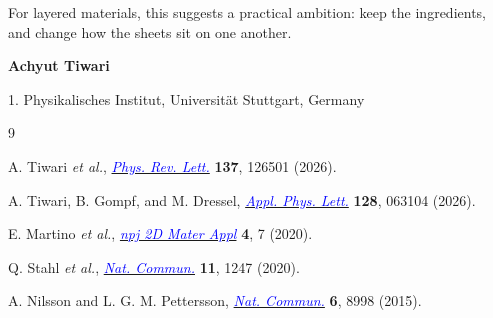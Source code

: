 \documentclass[11pt,a4paper]{article}
\begin{document}
For layered materials, this suggests a practical ambition: keep the ingredients, and change how the sheets sit on one another.


\vspace{8pt}
{\sffamily\bfseries Achyut Tiwari\par}
{\small 1. Physikalisches Institut, Universit\"at Stuttgart, Germany\par}
\vspace{10pt}

\begin{thebibliography}{9}
\small
\setlength{\itemsep}{6pt}

A. Tiwari \textit{et al.},
\href{https://doi.org/10.1103/pwzn-m4d2}
{\textcolor{blue}{\textit{Phys. Rev. Lett.}}}
\textbf{137}, 126501 (2026).

A. Tiwari, B. Gompf, and M. Dressel,
\href{https://doi.org/10.1063/5.0315654}
{\textcolor{blue}{\textit{Appl. Phys. Lett.}}}
\textbf{128}, 063104 (2026).

E. Martino \textit{et al.},
\href{https://doi.org/10.1038/s41699-020-0145-z}
{\textcolor{blue}{\textit{npj 2D Mater Appl}}}
\textbf{4}, 7 (2020).

Q. Stahl \textit{et al.},
\href{https://doi.org/10.1038/s41467-020-15079-1}
{\textcolor{blue}{\textit{Nat. Commun.}}}
\textbf{11}, 1247 (2020).

A. Nilsson and L. G. M. Pettersson,
\href{https://doi.org/10.1038/ncomms9998}
{\textcolor{blue}{\textit{Nat. Commun.}}}
\textbf{6}, 8998 (2015).

\end{thebibliography}
\end{document}

